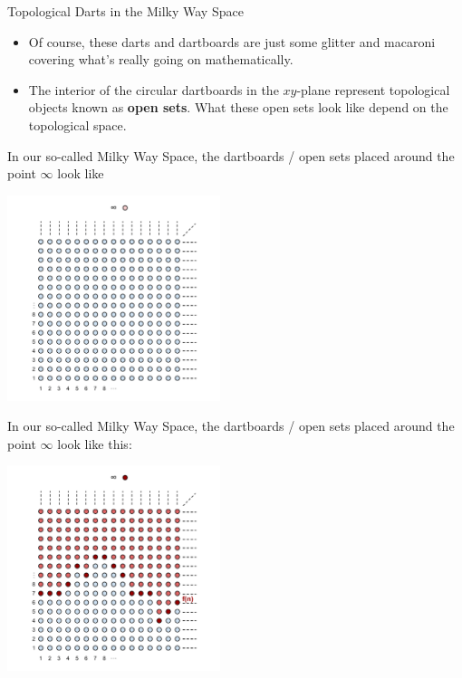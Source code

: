 \documentclass{beamer}
\begin{document}
\begin{frame}{Topological Darts in the Milky Way Space}
  \begin{itemize}
    \item
      Of course, these darts and dartboards are just some glitter and macaroni covering what's really going on mathematically.
    \pause
    \item
      The interior of the circular dartboards in the $xy$-plane represent topological objects known as \textbf{open sets}. What these open sets look like depend on the topological space.
  \end{itemize}
\end{frame}
\begin{frame}
  In our so-called Milky Way Space, the dartboards / open sets placed around the point $\infty$ look like
  \begin{center}
    \includegraphics[height=6cm]{images/milky_way}
  \end{center}
\end{frame}
\begin{frame}
  In our so-called Milky Way Space, the dartboards / open sets placed around the point $\infty$ look like this:
  \begin{center}
    \includegraphics[height=6cm]{images/milky_way_topology}
  \end{center}
\end{frame}
\end{document}
